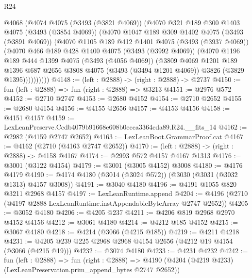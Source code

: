 \begin{lexlean}{R24}
\begin{coremodule}
      @4068
        (@4074
          @4075
          (@3493 (@3821 @4069))
          (@4070
            @321
            @189
            @300
            @1403
            @4075
            (@3493 (@3854 @4069))
            (@4070
              @1047
              @189
              @309
              @1402
              @4075
              (@3493 (@3891 @4069))
              (@4070
                @1105
                @189
                @412
                @1401
                @4075
                (@3493 (@3937 @4069))
                (@4070
                  @466
                  @189
                  @428
                  @1400
                  @4075
                  (@3493 (@3992 @4069))
                  (@4070
                    @1196
                    @189
                    @444
                    @1399
                    @4075
                    (@3493 (@4056 @4069))
                    (@3809
                      @4069
                      @1201
                      @189
                      @1396
                      @687
                      @2656
                      @3808
                      @4075
                      (@3493 (@3494 @1201 @4069))
                      @3826
                      (@3829 @1395))))))))))
@4148 := (left : @2888) -> (right : @2888) -> @2737
@4150 := fun (left : @2888) => fun (right : @2888) => @3213
@4151 := @2976 @572
@4152 := @2710 @2747
@4153 := @2680 @4152
@4154 := @2710 @2652
@4155 := @2680 @4154
@4156 := @4155 @2656
@4157 := @4153 @4156
@4158 := @4151 @4157
@4159 := LexLeanPreserve.Ccdb4079b91668e608b0ecca3364cda89.R24.__fits_14
@4162 := @2982 (@4159 @2747 @2652)
@4163 := LexLeanBoot.GrammarProof.cat
@4167 := @4162 (@2710 (@4163 @2747 @2652))
@4170 := (left : @2888) -> (right : @2888) -> @4158 @4167
@4174 := @2993 @572 @4157 @4167 @1313
@4176 := @3001 (@3122 @4154)
@4179 := @3001 (@3005 @4152) @3008
@4180 := @4176 @4179
@4190 := @4174 @4180 (@3014 (@3024 @572)) (@3030 (@3031 (@3032 @1313) @4157 @3008))
@4191 := @3040 @4180
@4196 := @4191 @1055 @820 @3211 @2968 @4157
@4197 := LexLeanRuntime.append
@4204 := @4196 (@2710 (@4197 @2888 LexLeanRuntime.instAppendableByteArray @2747 @2652))
@4205 := @3052 @4180
@4206 := @4205 @237
@4211 := @4206 @819 @2968 @2970 @4152 @4156
@4212 := @3061 @4180
@4214 := @4212 @185 @4152
@4215 := @3067 @4180
@4218 := @4214 (@3066 (@4215 @185))
@4219 := @4211 @4218
@4231 := @4205 @239 @225 @2968 @2968 @4154 @2656 (@4212 @19 @4154 (@3066 (@4215 @19)))
@4232 := @3074 @4180
@4233 := @4231 @4232
@4242 := fun (left : @2888) =>
  fun (right : @2888) =>
  @4190 (@4204 (@4219 @4233) (LexLeanPreservation.prim_append_bytes @2747 @2652))

\end{coremodule}
\end{lexlean}
